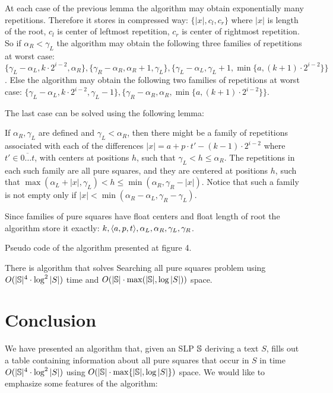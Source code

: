 ﻿\documentclass[11pt]{article}
\begin{document}
At each case of the previous lemma the algorithm may obtain exponentially many repetitions. Therefore it stores in
compressed way: $\{|x|, c_l, c_r\}$ where $|x|$ is length of the root, $c_l$ is center of leftmost repetition,
$c_r$ is center of rightmost repetition. So if $\alpha_R < \gamma_L$ the algorithm may obtain the following three
families of repetitions at worst case: $\{\gamma_L - \alpha_L, k \cdot 2^{i-2}, \alpha_R\}, \{\gamma_R - \alpha_R,
\alpha_R + 1, \gamma_L\}, \{\gamma_L - \alpha_L, \gamma_L + 1, \min\{a,(k+1) \cdot 2^{i-2}\}\}$. Else the algorithm may
obtain the following two families of repetitions at worst case: $\{\gamma_L - \alpha_L, k \cdot 2^{i-2}, \gamma_L - 1\},
\{\gamma_R - \alpha_R, \alpha_R, \min\{a,(k+1) \cdot 2^{i-2}\}\}$.

The last case can be solved using the following lemma:

\begin{lem}[{\rm\cite{2}}]
If $\alpha_R, \gamma_L$ are defined and $\gamma_L < \alpha_R$, then there might be a family of repetitions
associated with each of the differences $|x| = a + p\cdot t' - (k-1)\cdot 2^{i-2}$ where $t' \in \overline{0\dots t}$,
with centers at positions $h$, such that $\gamma_L < h \leq \alpha_R$. The repetitions in each such family are all
pure squares, and they are centered at positions $h$, such that $\max(\alpha_L + |x|, \gamma_L) < h \leq
\min(\alpha_R, \gamma_R-|x|)$. Notice that such a family is not empty only if $|x| < \min(\alpha_R-\alpha_L,
\gamma_R-\gamma_L)$.
\end{lem}

Since families of pure squares have float centers and float length of root the algorithm store it exactly:
$k, \langle a, p, t\rangle, \alpha_L, \alpha_R, \gamma_L, \gamma_R$. 

Pseudo code of the algorithm presented at figure 4.

\SearchingPureSquaresCode

\begin{thm}
There is algorithm that solves Searching all pure squares problem using $O(|\mathbb{S}|^4 \cdot \log^2{|S|})$ time and
$O(|\mathbb{S}| \cdot \max(|\mathbb{S}|, \log{|S|}))$ space.
\end{thm}

\section{Conclusion}

We have presented an algorithm that, given an SLP $\mathbb{S}$ deriving a text $S$, fills out a table containing
information about all pure squares that occur in $S$ in time $O(|\mathbb{S}|^4\cdot \log^2{|S|})$ using
$O(|\mathbb{S}|\cdot \max\{ |\mathbb{S}|, \log{|S|}\})$ space. We would like to emphasize some features of the
algorithm:
\end{document}
